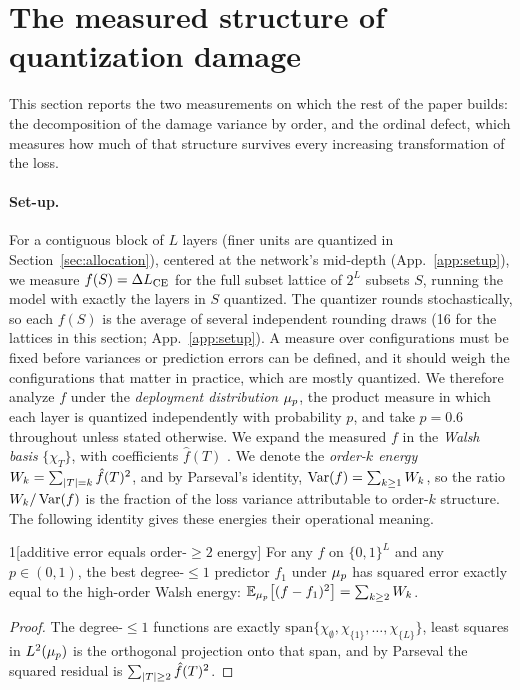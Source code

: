 \section{The measured structure of quantization damage}\label{sec:walsh}

This section reports the two measurements on which the rest of the paper builds: the decomposition of the
damage variance by order, and the ordinal defect, which measures how much of that structure survives every
increasing transformation of the loss.

\paragraph{Set-up.} For a contiguous block of $L$ layers (finer units are quantized in
Section~\ref{sec:allocation}), centered at the network's mid-depth
(App.~\ref{app:setup}), we measure $f(S)=\Delta L_{\mathrm{CE}}$ for the full subset lattice of $2^L$ subsets
$S$, running the model with exactly the layers in $S$ quantized. The quantizer rounds stochastically, so
each $f(S)$ is the average of several independent rounding draws (16 for the lattices in this section;
App.~\ref{app:setup}). A measure over configurations must be fixed before variances or prediction
errors can be defined, and it should weigh the configurations that matter in practice, which are mostly
quantized. We therefore analyze $f$ under the \emph{deployment distribution} $\mu_p$, the product measure
in which each layer is quantized independently with probability $p$, and take $p=0.6$ throughout unless
stated otherwise. We expand the measured $f$ in the
\emph{Walsh basis} $\{\chi_T\}$, with coefficients $\hat f(T)$ \citep{odonnell2014boolean}. We denote the
\emph{order-$k$ energy} $W_k = \sum_{|T|=k} \hat f(T)^2$, and by Parseval's identity, $\operatorname{Var}(f)=\sum_{k\ge 1}W_k$, so the ratio $W_k/\operatorname{Var}(f)$ is the
fraction of the loss variance attributable to order-$k$ structure. The following identity gives these energies their
operational meaning.

\begin{customthm}{1}[additive error equals order-$\ge 2$ energy]\label{thm:one}
For any $f$ on $\{0,1\}^L$ and any $p\in(0,1)$, the best degree-$\le 1$ 
predictor $f_1$ under $\mu_p$ has squared error exactly equal to the high-order Walsh energy:
$\mathbb{E}_{\mu_p}\bigl[(f-f_1)^2\bigr] = \sum_{k\ge 2} W_k$.
\end{customthm}

\begin{proof}
The degree-$\le 1$ functions are exactly $\mathrm{span}\{\chi_\emptyset, \chi_{\{1\}}, \ldots,
\chi_{\{L\}}\}$, least squares in $L^2(\mu_p)$ is the orthogonal projection onto that span, and by
Parseval the squared residual is $\sum_{|T|\ge 2}\hat f(T)^2$.
\end{proof}


